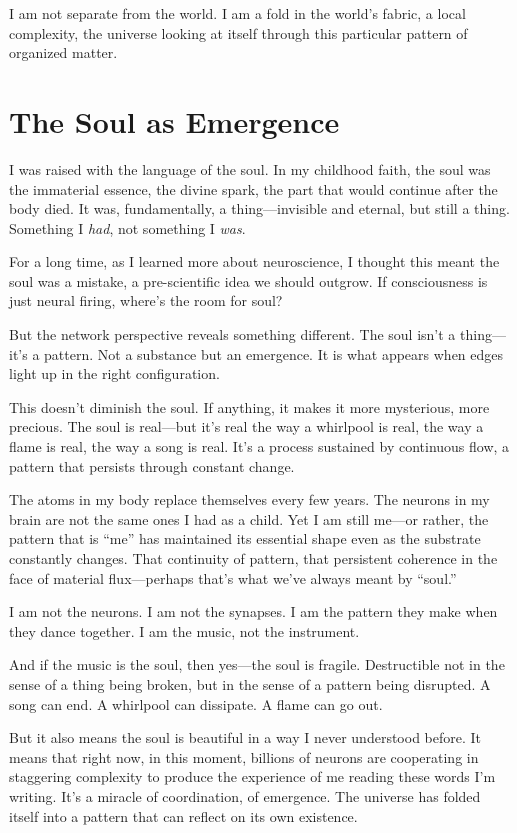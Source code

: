 \documentclass[12pt,a4paper]{article}
\begin{document}
I am not separate from the world. I am a fold in the world's fabric, a local complexity, the universe looking at itself through this particular pattern of organized matter.

\section*{The Soul as Emergence}

I was raised with the language of the soul. In my childhood faith, the soul was the immaterial essence, the divine spark, the part that would continue after the body died. It was, fundamentally, a thing---invisible and eternal, but still a thing. Something I \textit{had}, not something I \textit{was}.

For a long time, as I learned more about neuroscience, I thought this meant the soul was a mistake, a pre-scientific idea we should outgrow. If consciousness is just neural firing, where's the room for soul?

But the network perspective reveals something different. The soul isn't a thing---it's a pattern. Not a substance but an emergence. It is what appears when edges light up in the right configuration.

This doesn't diminish the soul. If anything, it makes it more mysterious, more precious. The soul is real---but it's real the way a whirlpool is real, the way a flame is real, the way a song is real. It's a process sustained by continuous flow, a pattern that persists through constant change.

The atoms in my body replace themselves every few years. The neurons in my brain are not the same ones I had as a child. Yet I am still me---or rather, the pattern that is ``me'' has maintained its essential shape even as the substrate constantly changes. That continuity of pattern, that persistent coherence in the face of material flux---perhaps that's what we've always meant by ``soul.''

I am not the neurons. I am not the synapses. I am the pattern they make when they dance together. I am the music, not the instrument.

And if the music is the soul, then yes---the soul is fragile. Destructible not in the sense of a thing being broken, but in the sense of a pattern being disrupted. A song can end. A whirlpool can dissipate. A flame can go out.

But it also means the soul is beautiful in a way I never understood before. It means that right now, in this moment, billions of neurons are cooperating in staggering complexity to produce the experience of me reading these words I'm writing. It's a miracle of coordination, of emergence. The universe has folded itself into a pattern that can reflect on its own existence.
\end{document}
